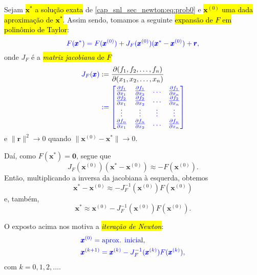 Sejam \hl{$\pmb{x}^*$ a solução exata} de \eqref{cap_snl_sec_newton:eq:prob0} e \hl{$\pmb{x}^{(0)}$ uma dada aproximação de $\pmb{x}^*$}. Assim sendo, tomamos a seguinte \hl{expansão de $F$ em polinômio de Taylor}{\taylor}:
\begin{equation}\color{blue}F(\pmb{x}^*) = F(\pmb{x}^{(0)}) + J_F(\pmb{x}^{(0)})(\pmb{x}^*-\pmb{x}^{(0)}) + \pmb{r},
\end{equation}
onde $J_F$ é a \hl{\emph{matriz jacobiana}{\jacobi} de $F$}
\begin{align}
  \color{blue}J_F(\pmb{x}) &:= \frac{\partial(f_1, f_2, \dotsc, f_n)}{\partial(x_1, x_2, \dotsc, x_n)}\\
  &\color{blue}:= \begin{bmatrix}
    \frac{\partial f_1}{\partial x_1} & \frac{\partial f_1}{\partial x_2} & \ldots & \frac{\partial f_1}{\partial x_n}\\
    \frac{\partial f_2}{\partial x_1} & \frac{\partial f_2}{\partial x_2} & \ldots & \frac{\partial f_2}{\partial x_n}\\
    \vdots & \vdots & \vdots & \vdots \\
    \frac{\partial f_n}{\partial x_1} & \frac{\partial f_n}{\partial x_2} & \ldots & \frac{\partial f_n}{\partial x_n}\\
  \end{bmatrix}
\end{align}
e $\|\pmb{r}\|^2\to 0$ quando $\|\pmb{x}^{(0)}-\pmb{x}^*\|\to 0$. 

Daí, como $F(\pmb{x}^*) = \pmb{0}$, segue que
\begin{equation}
  J_F(\pmb{x}^{(0)})(\pmb{x}^*-\pmb{x}^{(0)}) \approx -F(\pmb{x}^{(0)}).
\end{equation}
Então, multiplicando a inversa da jacobiana à esquerda, obtemos
\begin{equation}
  \pmb{x}^*-\pmb{x}^{(0)} \approx - J_F^{-1}(\pmb{x}^{(0)})F(\pmb{x}^{(0)})
\end{equation}
e, também,
\begin{equation}
  \pmb{x}^* \approx \pmb{x}^{(0)} - J_F^{-1}(\pmb{x}^{(0)})F(\pmb{x}^{(0)}).
\end{equation}

O exposto acima nos motiva a \hl{\emph{iteração de Newton}}{\newton}:
\begin{subequations}\hleq
  \begin{align}
    &\pmb{x}^{(0)} = \text{aprox. inicial},\\
    &\pmb{x}^{(k+1)} = \pmb{x}^{(k)} - J_F^{-1}(\pmb{x}^{(k)})F(\pmb{x}^{(k)}),
  \end{align}
\end{subequations}
com $k=0, 1, 2, \ldots$.

